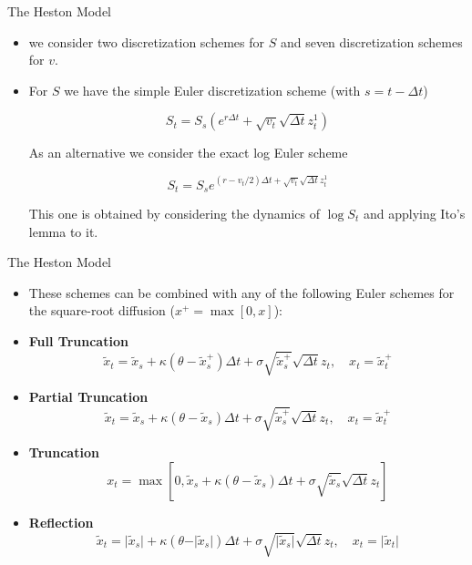 \documentclass[11pt]{beamer}
\begin{document}
\begin{frame}{The Heston Model}
\begin{itemize}
\item we consider two discretization schemes for $S$ and seven discretization schemes for $v$. 
\item For $S$ we have the simple Euler discretization scheme (with $s=t-\Delta t$)

$$ S_t = S_s \left( e^{r\Delta t} + \sqrt{v_t} \sqrt{\Delta t} z_t^1 \right)$$

As an alternative we consider the exact log  Euler scheme

$$S_t = S_s e^{(r-v_t/2)\Delta t + \sqrt{v_t} \sqrt{\Delta t} z_t^1} $$

This one is obtained by considering the dynamics of $\log S_t$ and applying  Ito's lemma to it.
\end{itemize}
\end{frame}
\begin{frame}{The Heston Model}
\begin{itemize}
\item These schemes can be combined with any of the following Euler schemes for the square-root diffusion ($x^+ = \max[0,x]$):
\item \textbf{Full Truncation}
$$\tilde x_t=\tilde x_s + \kappa(\theta - \tilde x_s^+)\Delta t + \sigma  \sqrt{\tilde x_s^+} \sqrt{\Delta t} z_t ,\quad x_t = \tilde x_t^+$$
\item \textbf{Partial Truncation}
$$\tilde x_t=\tilde x_s + \kappa(\theta - \tilde x_s)\Delta t + \sigma  \sqrt{\tilde x_s^+} \sqrt{\Delta t} z_t ,\quad x_t = \tilde x_t^+$$
\item \textbf{Truncation}
$$x_t = \max \left[0,\tilde x_s + \kappa(\theta - \tilde x_s)\Delta t + \sigma  \sqrt{\tilde x_s} \sqrt{\Delta t} z_t \right] $$
\item \textbf{Reflection}
$$\tilde x_t=\vert \tilde x_s \vert + \kappa(\theta - \vert \tilde x_s \vert )\Delta t + \sigma  \sqrt{\vert \tilde x_s \vert} \sqrt{\Delta t} z_t ,\quad x_t = \vert \tilde x_t \vert $$
\end{itemize}
\end{frame}
\end{document}
